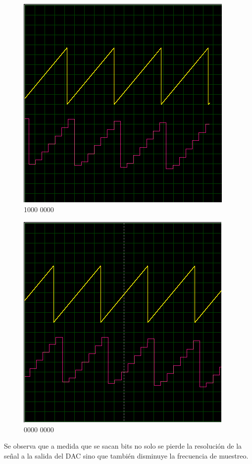 \begin{multicols}{2}
\begin{figure}[H]
\includegraphics[width=0.8\linewidth]{ImagenesEjercicio1/bit7.png}
\caption{1000 0000}
\end{figure}
\begin{figure}[H]
\centering
\includegraphics[width=0.8\linewidth]{ImagenesEjercicio1/bit8.png}
\caption{0000 0000}
\end{figure}
\end{multicols}

Se observa que a medida que se sacan bits no solo se pierde la resolución de la señal a la salida del DAC sino que también disminuye la frecuencia de muestreo.

